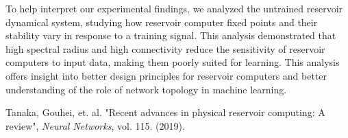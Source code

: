 \documentclass[12pt]{article}
\begin{document}
To help interpret our experimental findings, we analyzed the untrained reservoir dynamical system, studying how reservoir computer fixed points and their stability vary in response to a training signal. This analysis demonstrated that high spectral radius and high connectivity reduce the sensitivity of reservoir computers to input data, making them poorly suited for learning. This analysis offers insight into better design principles for reservoir computers and better understanding of the role of network topology in machine learning.



\begin{thebibliography}{9}
Tanaka, Gouhei, et. al. "Recent advances in physical reservoir computing: A review",
\textit{Neural Networks}, vol. 115. (2019).

\end{thebibliography}
\end{document}
